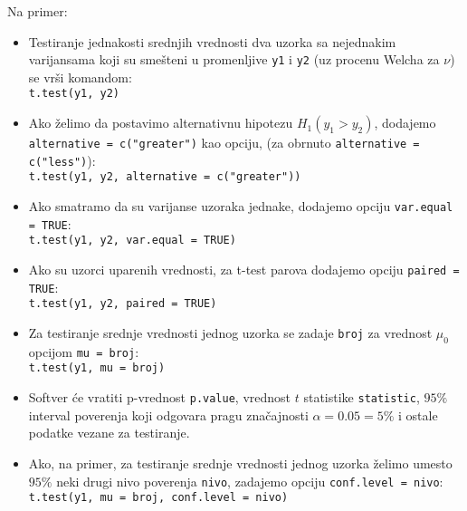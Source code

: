 \documentclass[twoside,titlepage,12pt,a4paper]{book}
\numberwithin{equation}{chapter}
\begin{document}
Na primer:
\begin{itemize}
\item
Testiranje jednakosti srednjih vrednosti dva uzorka sa nejednakim varijansama koji su smešteni u promenljive \texttt{y1} i \texttt{y2} (uz procenu Welcha za $\nu$) se vrši komandom:\\[2pt]
\texttt{t.test(y1, y2)}
\item
Ako želimo da postavimo alternativnu hipotezu $H_1 ( y_1 > y_2 )$, dodajemo \texttt{alternative = c("greater")} kao opciju, (za obrnuto \texttt{alternative = c("less")}):\\[2pt]
\texttt{t.test(y1, y2, alternative = c("greater"))}
\item
Ako smatramo da su varijanse uzoraka jednake, dodajemo opciju \texttt{var.equal = TRUE}:\\[2pt]
\texttt{t.test(y1, y2, var.equal = TRUE)}
\item
Ako su uzorci uparenih vrednosti, za t-test parova dodajemo opciju \texttt{paired = TRUE}:\\[2pt]
\texttt{t.test(y1, y2, paired = TRUE)}
\item
Za testiranje srednje vrednosti jednog uzorka se zadaje \texttt{broj} za vrednost $\mu_0$ opcijom \texttt{mu = broj}:\\[2pt]
\texttt{t.test(y1, mu = broj)}
\item
Softver će vratiti p-vrednost \texttt{p.value}, vrednost $t$ statistike \texttt{statistic}, $95\%$ interval poverenja koji odgovara pragu značajnosti $\alpha = 0.05 = 5\%$ i ostale podatke vezane za testiranje.
\item
Ako, na primer, za testiranje srednje vrednosti jednog uzorka želimo umesto $95\%$ neki drugi nivo poverenja \texttt{nivo}, zadajemo opciju \texttt{conf.level = nivo}:\\[2pt]
\texttt{t.test(y1, mu = broj, conf.level = nivo)}
\end{itemize}
\end{document}
